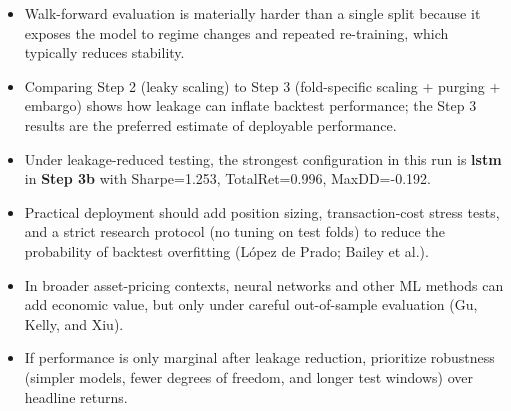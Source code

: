\begin{itemize}
\item Walk-forward evaluation is materially harder than a single split because it exposes the model to regime changes and repeated re-training, which typically reduces stability.
\item Comparing Step 2 (leaky scaling) to Step 3 (fold-specific scaling + purging + embargo) shows how leakage can inflate backtest performance; the Step 3 results are the preferred estimate of deployable performance.
\item Under leakage-reduced testing, the strongest configuration in this run is \textbf{lstm} in \textbf{Step 3b} with Sharpe=1.253, TotalRet=0.996, MaxDD=-0.192.
\item Practical deployment should add position sizing, transaction-cost stress tests, and a strict research protocol (no tuning on test folds) to reduce the probability of backtest overfitting (L\'opez de Prado; Bailey et al.).
\item In broader asset-pricing contexts, neural networks and other ML methods can add economic value, but only under careful out-of-sample evaluation (Gu, Kelly, and Xiu).
\item If performance is only marginal after leakage reduction, prioritize robustness (simpler models, fewer degrees of freedom, and longer test windows) over headline returns.
\end{itemize}

